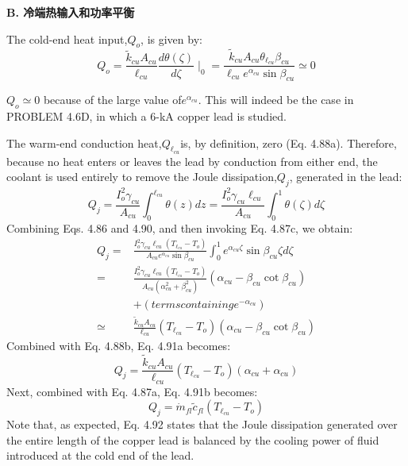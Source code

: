 \textbf{B. 冷端热输入和功率平衡}

The cold-end heat input,$Q_o$, is given by:
\begin{equation}%
Q_o=\frac{\tilde{k}_{cu}A_{cu}}{\ell_{cu}}\frac{d\theta(\zeta)}{d\zeta}\mid_0=\frac{\tilde{k}_{cu}A_{cu}\theta_{\ell_{cu}}\beta_{cu}}{\ell_{cu}e^{\alpha_{cu}}\sin\beta_{cu}}\simeq 0
\end{equation}

$Q_o\simeq 0$ because of the large value of$e^{\alpha_{cu}}$. This will indeed be the case in PROBLEM
4.6D, in which a 6-kA copper lead is studied.

The warm-end conduction heat,$Q_{\ell_{cu}}$is, by definition, zero (Eq. 4.88a). Therefore,
because no heat enters or leaves the lead by conduction from either end, the coolant
is used entirely to remove the Joule dissipation,$Q_j$, generated in the lead:
\begin{equation}%
Q_j=\frac{I_{o}^{2}\gamma_{cu}}{A_{cu}}\int_{0}^{\ell_{cu}}\theta(z)dz 
=\frac{I_{o}^{2}\gamma_{cu}\ell_{cu}}{A_{cu}}\int_{0}^{1}\theta(\zeta)d\zeta
\end{equation}
Combining Eqs. 4.86 and 4.90, and then invoking Eq. 4.87c, we obtain:
\begin{align}%
Q_j=&\frac{I_{o}^{2}\gamma_{cu}\ell_{cu}(T_{\ell_{cu}}-T_o)}{A_{cu}e^{\alpha_{cu}}\sin\beta_{cu}}\int_{0}^{1}e^{\alpha_{cu}\zeta}\sin\beta_{cu}\zeta d\zeta \\
=&\frac{I_{o}^{2}\gamma_{cu}\ell_{cu}(T_{\ell_{cu}}-T_o)}{A_{cu}(\alpha_{cu}^{2}+\beta_{cu}^{2})}(\alpha_{cu}-\beta_{cu}\cot\beta_{cu}) \\
&+(terms containing e^{-\alpha_{cu}}) \\
\simeq&\frac{\tilde{k}_{cu}A_{cu}}{\ell_{cu}}(T_{\ell_{cu}}-T_o)(\alpha_{cu}-\beta_{cu}\cot\beta_{cu})
\end{align}
Combined with Eq. 4.88b, Eq. 4.91a becomes:
\begin{equation}%
Q_j=\frac{\tilde{k}_{cu}A_{cu}}{\ell_{cu}}(T_{\ell_{cu}}-T_o)(\alpha_{cu}+\alpha_{cu})
\end{equation}
Next, combined with Eq. 4.87a, Eq. 4.91b becomes:
\begin{equation}%
Q_j=\dot{m}_{fl}\tilde{c}_{fl}(T_{\ell_{cu}}-T_o)
\end{equation}
Note that, as expected, Eq. 4.92 states that the Joule dissipation generated over
the entire length of the copper lead is balanced by the cooling power of fluid
introduced at the cold end of the lead.

